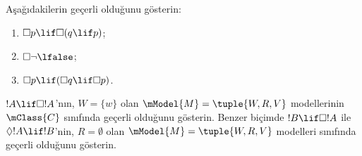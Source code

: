 \documentclass[../../../include/open-logic-section]{subfiles}
\begin{document}
\begin{prob}
  Aşağıdakilerin geçerli olduğunu gösterin:
  \begin{enumerate}
  \item $\Box p \lif \Box (q \lif p)$;
  \item $\Box \lnot \lfalse$;
  \item $\Box p \lif (\Box q \lif \Box p)$.
  \end{enumerate}
\end{prob}

\begin{prob}
  $!A \lif \Box!A$'nın, $W = \{w\}$ olan
  $\mModel{M} = \tuple{W, R, V}$ modellerinin $\mClass{C}$ sınıfında geçerli
  olduğunu gösterin. Benzer biçimde $!B \lif \Box !A$ ile
  $\Diamond !A \lif !B$'nin, $R = \emptyset$ olan
  $\mModel{M} = \tuple{W, R, V}$ modelleri sınıfında geçerli olduğunu
  gösterin.
\end{prob}
\end{document}

